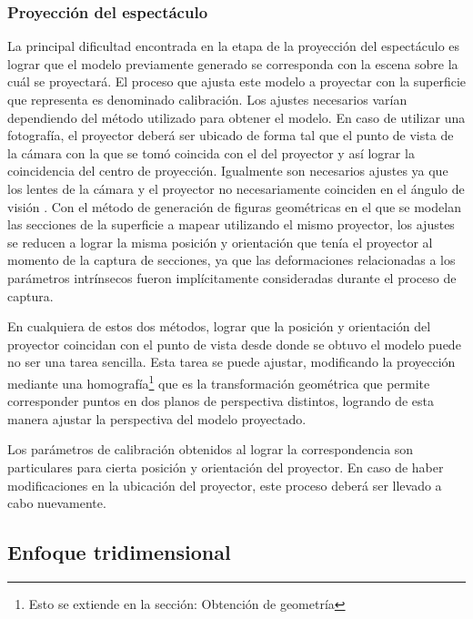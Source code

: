 \subsubsection{Proyección del espectáculo}
La principal dificultad encontrada en la etapa de la proyección del espectáculo es lograr que el modelo previamente generado se corresponda con la escena sobre la cuál se proyectará. El proceso que ajusta este modelo a proyectar con la superficie que representa es denominado calibración.
Los ajustes necesarios varían dependiendo del método utilizado para obtener el modelo. En caso de utilizar una fotografía, el proyector deberá ser ubicado de forma tal que el punto de vista de la cámara con la que se tomó coincida con el del proyector y así lograr la coincidencia del centro de proyección. Igualmente son necesarios ajustes ya que los lentes de la cámara y el proyector no necesariamente coinciden en el ángulo de visión \cite{LibroCompGrafica2}\cite{LibroPhotographicOptics}. Con el método de generación de figuras geométricas en el que se modelan las secciones de la superficie a mapear utilizando el mismo proyector, los ajustes se reducen a lograr la misma posición y orientación que tenía el proyector al momento de la captura de secciones, ya que las deformaciones relacionadas a los parámetros intrínsecos fueron implícitamente consideradas durante el proceso de captura.

En cualquiera de estos dos métodos, lograr que la posición y orientación del proyector coincidan con el punto de vista desde donde se obtuvo el modelo puede no ser una tarea sencilla. Esta tarea se puede ajustar, modificando la proyección mediante una homografía\footnote{Esto se extiende en la sección: Obtención de geometría} que es la transformación geométrica que permite corresponder puntos en dos planos de perspectiva distintos, logrando de esta manera ajustar la perspectiva del modelo proyectado.

Los parámetros de calibración obtenidos al lograr la correspondencia son particulares para cierta posición y orientación del proyector. En caso de haber modificaciones en la ubicación del proyector, este proceso deberá ser llevado a cabo nuevamente.

\subsection{Enfoque tridimensional}
